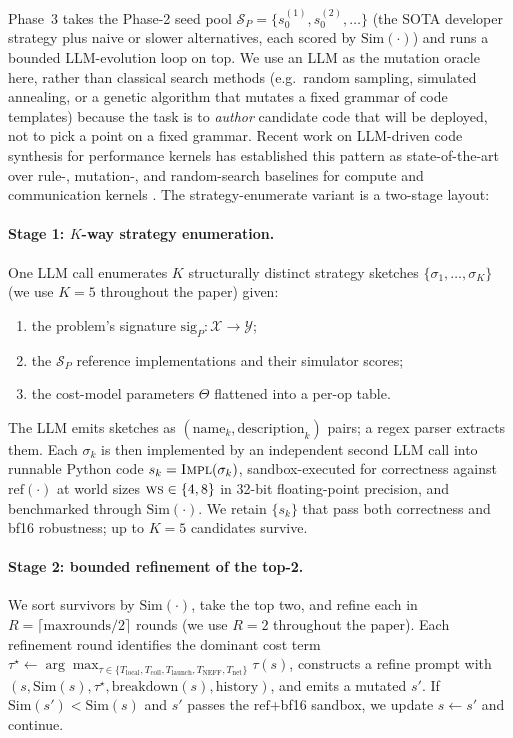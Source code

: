 Phase~3 takes the Phase-2 seed pool
$\mathcal{S}_P = \{s_0^{(1)}, s_0^{(2)}, \ldots\}$ (the SOTA
developer strategy plus naive or slower alternatives, each
scored by $\mathrm{Sim}(\cdot)$) and runs a bounded LLM-evolution
loop on top. We use an LLM as the mutation oracle here, rather
than classical search methods (e.g.\ random sampling, simulated
annealing, or a genetic algorithm that mutates a fixed grammar
of code templates) because the task is to \emph{author}
candidate code that will be deployed, not to pick a point on a
fixed grammar. Recent work on LLM-driven code synthesis for
performance kernels has established this pattern as
state-of-the-art over rule-, mutation-, and random-search
baselines for compute and communication kernels
\cite{romera2024funsearch, novikov2025alphaevolve,
deepseek2024coder}. The strategy-enumerate variant is a
two-stage layout:

\paragraph{Stage 1: $K$-way strategy enumeration.}
One LLM call enumerates $K$ structurally distinct strategy
sketches
$\{\sigma_1, \ldots, \sigma_K\}$ (we use $K = 5$ throughout the
paper) given:
\begin{enumerate}
  \item the problem's signature
  $\mathrm{sig}_P : \mathcal{X} \to \mathcal{Y}$;
  \item the $\mathcal{S}_P$ reference implementations and their
  simulator scores;
  \item the cost-model parameters
  $\Theta$ flattened into a per-op table.
\end{enumerate}
The LLM emits sketches as
$(\text{name}_k, \text{description}_k)$ pairs; a regex parser
extracts them. Each $\sigma_k$ is then implemented by an
independent second LLM call into runnable Python code
$s_k = \textsc{Impl}(\sigma_k)$, sandbox-executed for correctness
against $\mathrm{ref}(\cdot)$ at world sizes
$\textsc{ws} \in \{4, 8\}$ in 32-bit floating-point precision, and
benchmarked through $\mathrm{Sim}(\cdot)$. We retain $\{s_k\}$ that
pass both correctness and bf16 robustness; up to $K = 5$ candidates
survive.

\paragraph{Stage 2: bounded refinement of the top-2.}
We sort survivors by $\mathrm{Sim}(\cdot)$, take the top two, and
refine each in $R = \lceil \mathrm{maxrounds}/2 \rceil$ rounds
(we use $R = 2$ throughout the paper). Each refinement round
identifies the dominant cost term
$\tau^\star \gets \arg\max_{\tau \in
\{T_{\text{local}}, T_{\text{coll}}, T_{\text{launch}},
T_{\text{NEFF}}, T_{\text{net}}\}} \tau(s)$,
constructs a refine prompt with
$(s, \mathrm{Sim}(s), \tau^\star, \mathrm{breakdown}(s),
\mathrm{history})$, and emits a mutated $s'$. If
$\mathrm{Sim}(s') < \mathrm{Sim}(s)$ and $s'$ passes the
$\mathrm{ref}$+bf16 sandbox, we update $s \gets s'$ and
continue.

